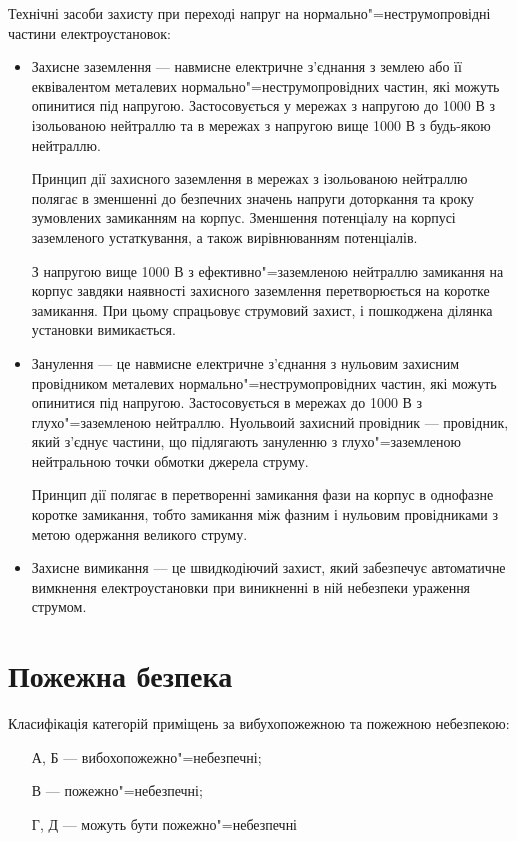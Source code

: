 \documentclass[a5paper,10pt,notitlepage,pdftex,headsepline]{scrartcl}
\begin{document}
  Технічні засоби захисту при переході напруг на нормально"=неструмопровідні
  частини електроустановок:
  \begin{itemize}
    \item Захисне заземлення --- навмисне електричне з’єднання з землею або її
      еквівалентом металевих нормально"=неструмопровідних частин, які можуть
      опинитися під напругою.
      Застосовується у мережах з напругою до 1000 В з ізольованою нейтраллю та
      в мережах з напругою вище 1000 В з будь-якою нейтраллю.

      Принцип дії захисного заземлення в мережах з ізольованою нейтраллю
      полягає в зменшенні до безпечних значень напруги доторкання та кроку
      зумовлених замиканням на корпус.
      Зменшення потенціалу на корпусі заземленого устаткування, а також
      вирівнюванням потенціалів.

      З напругою вище 1000 В з ефективно"=заземленою нейтраллю замикання на
      корпус завдяки наявності захисного заземлення перетворюється на коротке
      замикання.
      При цьому спрацьовує струмовий захист, і пошкоджена ділянка установки
      вимикається.
    \item Занулення --- це навмисне електричне з’єднання з нульовим захисним
      провідником металевих нормально"=неструмопровідних частин, які можуть
      опинитися під напругою.
      Застосовується в мережах до 1000 В з глухо"=заземленою нейтраллю.
      Нуольвоий захисний провідник --- провідник, який з’єднує частини, що
      підлягають зануленню з глухо"=заземленою нейтральною точки обмотки
      джерела струму.

      Принцип дії полягає в перетворенні замикання фази на корпус в однофазне
      коротке замикання, тобто замикання між фазним і нульовим провідниками з
      метою одержання великого струму.
    \item Захисне вимикання --- це швидкодіючий захист, який забезпечує
      автоматичне вимкнення електроустановки при виникненні в ній небезпеки
      ураження струмом.
  \end{itemize}
\section{Пожежна безпека}
  Класифікація категорій приміщень за вибухопожежною та пожежною небезпекою:
  \begin{itemize}
    \item[А, Б] --- вибохопожежно"=небезпечні;
    \item[В] --- пожежно"=небезпечні;
    \item[Г, Д] --- можуть бути пожежно"=небезпечні
  \end{itemize}
\end{document}
